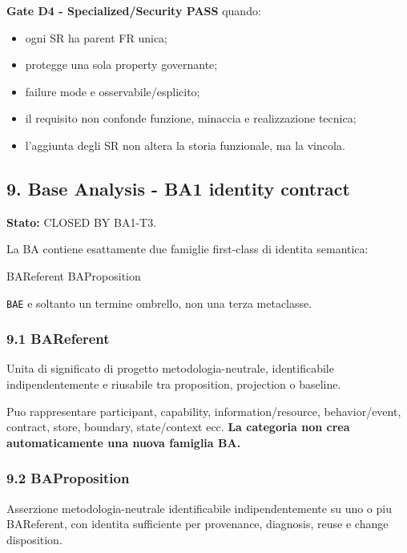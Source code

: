\documentclass[
  9pt,
  a4paper,
]{article}
\newenvironment{Shaded}{}{}
\newcommand{\NormalTok}[1]{#1}
\providecommand{\tightlist}{%
  \setlength{\itemsep}{0pt}\setlength{\parskip}{0pt}}
\begin{document}
\textbf{Gate D4 - Specialized/Security PASS} quando:

\begin{itemize}
\tightlist
\item
  ogni SR ha parent FR unica;
\item
  protegge una sola property governante;
\item
  failure mode e osservabile/esplicito;
\item
  il requisito non confonde funzione, minaccia e realizzazione tecnica;
\item
  l'aggiunta degli SR non altera la storia funzionale, ma la vincola.
\end{itemize}

\subsection{9. Base Analysis - BA1 identity
contract}\label{base-analysis---ba1-identity-contract}

\textbf{Stato:} CLOSED BY BA1-T3.

La BA contiene esattamente due famiglie first-class di identita
semantica:

\begin{Shaded}
\begin{Highlighting}[]
\NormalTok{BAReferent}
\NormalTok{BAProposition}
\end{Highlighting}
\end{Shaded}

\texttt{BAE} e soltanto un termine ombrello, non una terza metaclasse.

\subsubsection{9.1 BAReferent}\label{bareferent}

Unita di significato di progetto metodologia-neutrale, identificabile
indipendentemente e riusabile tra proposition, projection o baseline.

Puo rappresentare participant, capability, information/resource,
behavior/event, contract, store, boundary, state/context ecc. \textbf{La
categoria non crea automaticamente una nuova famiglia BA.}

\subsubsection{9.2 BAProposition}\label{baproposition}

Asserzione metodologia-neutrale identificabile indipendentemente su uno
o piu BAReferent, con identita sufficiente per provenance, diagnosis,
reuse e change disposition.
\end{document}
